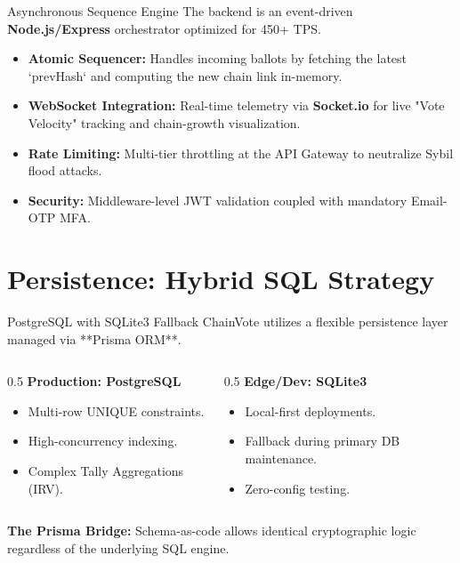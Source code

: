 \documentclass[10pt]{beamer}
\begin{document}
\begin{frame}{Asynchronous Sequence Engine}
    The backend is an event-driven \textbf{Node.js/Express} orchestrator optimized for 450+ TPS.
    \begin{itemize}
        \item \textbf{Atomic Sequencer:} Handles incoming ballots by fetching the latest `prevHash` and computing the new chain link in-memory.
        \item \textbf{WebSocket Integration:} Real-time telemetry via \textbf{Socket.io} for live "Vote Velocity" tracking and chain-growth visualization.
        \item \textbf{Rate Limiting:} Multi-tier throttling at the API Gateway to neutralize Sybil flood attacks.
        \item \textbf{Security:} Middleware-level JWT validation coupled with mandatory Email-OTP MFA.
    \end{itemize}
\end{frame}

\section{Persistence: Hybrid SQL Strategy}

\begin{frame}{PostgreSQL with SQLite3 Fallback}
    ChainVote utilizes a flexible persistence layer managed via **Prisma ORM**.
    \begin{columns}
        \begin{column}{0.5\textwidth}
            \textbf{Production: PostgreSQL}
            \begin{itemize}
                \item Multi-row UNIQUE constraints.
                \item High-concurrency indexing.
                \item Complex Tally Aggregations (IRV).
            \end{itemize}
        \end{column}
        \begin{column}{0.5\textwidth}
            \textbf{Edge/Dev: SQLite3}
            \begin{itemize}
                \item Local-first deployments.
                \item Fallback during primary DB maintenance.
                \item Zero-config testing.
            \end{itemize}
        \end{column}
    \end{columns}
    \vspace{0.4cm}
    \textbf{The Prisma Bridge:} Schema-as-code allows identical cryptographic logic regardless of the underlying SQL engine.
\end{frame}
\end{document}
